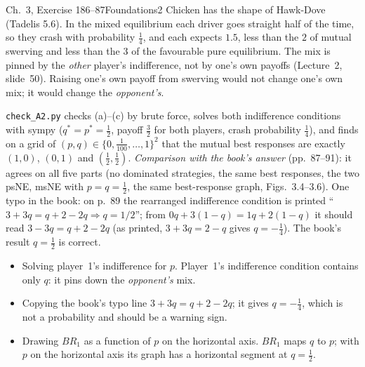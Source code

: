 \begin{exsol}{\MG{} Ch.~3, Exercise 1}{86--87}{Foundations}{2}
\interp Chicken has the shape of Hawk-Dove (Tadelis 5.6). In the mixed equilibrium each driver goes
straight half of the time, so they crash with probability $\tfrac14$, and each expects $1.5$,
less than the $2$ of mutual swerving and less than the $3$ of the favourable pure equilibrium.
The mix is pinned by the \emph{other} player's indifference, not by one's own payoffs
(Lecture~2, slide~50). Raising one's own payoff from swerving would not change one's own
mix; it would change the \emph{opponent's}.

\verify \texttt{check\_A2.py} checks (a)--(c) by brute force, solves both indifference conditions
with sympy ($q^* = p^* = \tfrac12$, payoff $\tfrac32$ for both players, crash probability
$\tfrac14$), and finds on a grid of $(p,q) \in
\{0, \tfrac1{100}, \dots, 1\}^2$ that the mutual best responses are exactly $(1,0)$, $(0,1)$ and
$(\tfrac12,\tfrac12)$. \emph{Comparison with the book's answer} (pp.~87--91): it agrees on all five
parts (no dominated strategies, the same best responses, the two psNE, msNE with $p = q = \tfrac12$,
the same best-response graph, Figs.~3.4--3.6). One typo in the book: on p.~89 the rearranged
indifference condition is printed ``$3 + 3q = q + 2 - 2q \Rightarrow q = 1/2$''; from
$0q + 3(1-q) = 1q + 2(1-q)$ it should read $3 - 3q = q + 2 - 2q$ (as printed, $3 + 3q = 2 - q$ gives
$q = -\tfrac14$). The book's result $q = \tfrac12$ is correct.

\mistakes
\begin{itemize}
  \item Solving player~1's indifference for $p$. Player~1's indifference condition contains
  only $q$: it pins down the \emph{opponent's} mix.
  \item Copying the book's typo line $3 + 3q = q + 2 - 2q$; it gives $q = -\tfrac14$, which is not a
  probability and should be a warning sign.
  \item Drawing $BR_1$ as a function of $p$ on the horizontal axis. $BR_1$ maps $q$ to $p$; with
  $p$ on the horizontal axis its graph has a horizontal segment at $q = \tfrac12$.
\end{itemize}

\end{exsol}
